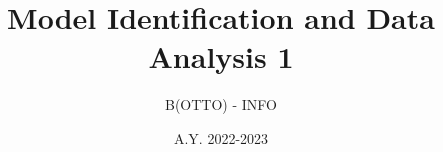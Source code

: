 \documentclass[working]{article}
\title{Model Identification and Data Analysis 1}
\author{B(OTTO) - INFO}
\date{A.Y. 2022-2023}
\begin{document}
  \createintro

  
  
  

  \listnotes
\end{document}
